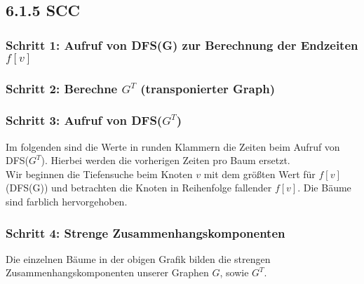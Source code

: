 
\gdef\Gfill{green}
\gdef\Gdesc{G[8/9]}
\gdef\Ffill{green}
\gdef\Fdesc{F[7/10]}
\gdef\Cfill{green}
\gdef\Cdesc{C[6/11]}
\gdef\Efill{green}
\gdef\Edesc{E[5/12]}
\gdef\Bfill{green}
\gdef\Bdesc{B[4/13]}
\gdef\Dfill{green}
\gdef\Ddesc{D[3/14]}
\gdef\Afill{green}
\gdef\Adesc{A[2/15]}
\gdef\sfill{green}
\gdef\sdesc{s[1/16]}
\subsection*{6.1.5 SCC}
\subsubsection*{Schritt 1: Aufruf von DFS(G) zur Berechnung der Endzeiten $f[v]$}
\gdef\ndist{2.5cm}


\subsubsection*{Schritt 2: Berechne $G^T$ (transponierter Graph)}


\subsubsection*{Schritt 3: Aufruf von DFS($G^T$)}
Im folgenden sind die Werte in runden Klammern die Zeiten beim Aufruf von DFS($G^T$). Hierbei werden die vorherigen Zeiten pro Baum ersetzt.\\
Wir beginnen die Tiefensuche beim Knoten $v$ mit dem größten Wert für $f[v]$(DFS(G)) und betrachten die Knoten in Reihenfolge fallender $f[v]$.
Die Bäume sind farblich hervorgehoben.

\gdef\sdesc{s(1/2)}
\gdef\sfill{yellow}


\gdef\Adesc{A(3/16)}
\gdef\Afill{magenta}
\gdef\Bdesc{B(4/15)}
\gdef\Bfill{magenta}
\gdef\Cdesc{C(5/14)}
\gdef\Cfill{magenta}
\gdef\Edesc{E(6/13)}
\gdef\Efill{magenta}
\gdef\Gdesc{G(7/12)}
\gdef\Gfill{magenta}
\gdef\Ddesc{D(8/9)}
\gdef\Dfill{magenta}
\gdef\Fdesc{F(10/11)}
\gdef\Ffill{magenta}


\subsubsection*{Schritt 4: Strenge Zusammenhangskomponenten}
Die einzelnen Bäume in der obigen Grafik bilden die strengen Zusammenhangskomponenten unserer Graphen $G$, sowie $G^T$.